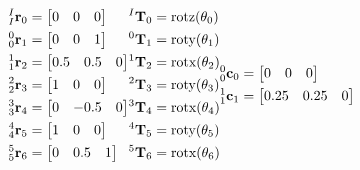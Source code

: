 \begin{align*}
    \begin{split}
        {^I_I \r _0} &= \begin{bmatrix} 0 & 0 & 0\end{bmatrix} \\
        {^0_0 \r _1} &= \begin{bmatrix} 0 & 0 & 1 \end{bmatrix} \\ 
        {^1_1 \r _2} &= \begin{bmatrix} 0.5& 0.5& 0 \end{bmatrix}\\
        {^2_2 \r _3} &= \begin{bmatrix} 1& 0& 0 \end{bmatrix}\\
        {^3_3 \r _4} &= \begin{bmatrix} 0& -0.5& 0\end{bmatrix}\\
        {^4_4 \r _5} &= \begin{bmatrix} 1& 0& 0 \end{bmatrix}\\
        {^5_5 \r _6} &= \begin{bmatrix} 0 & 0.5 & 1 \end{bmatrix}
    \end{split}
    \begin{split}
        {^I \T_0} &= \text{rotz}(\theta_0)\\
        {^0 \T_1} &= \text{roty}(\theta_1)\\
        {^1 \T_2} &= \text{rotx}(\theta_2)\\
        {^2 \T_3} &= \text{roty}(\theta_3)\\
        {^3 \T_4} &= \text{rotx}(\theta_4)\\
        {^4 \T_5} &= \text{roty}(\theta_5)\\
        {^5 \T_6} &= \text{rotx}(\theta_6)\\
    \end{split}
    \begin{split}
    \end{split}
    \begin{split}
        {^0_0 \com _0} &= \begin{bmatrix} 0& 0& 0 \end{bmatrix}\\
        {^1_1 \com _1} &= \begin{bmatrix} 0.25& 0.25& 0 \end{bmatrix}\\

\end{split}
\end{align*}
